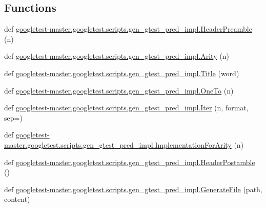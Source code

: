 \subsection*{Functions}
\begin{DoxyCompactItemize}
\item 
def \mbox{\hyperlink{namespacegoogletest-master_1_1googletest_1_1scripts_1_1gen__gtest__pred__impl_a3fc75fccee1b1e6492521b98b6d8ec86}{googletest-\/master.\+googletest.\+scripts.\+gen\+\_\+gtest\+\_\+pred\+\_\+impl.\+Header\+Preamble}} (n)
\item 
def \mbox{\hyperlink{namespacegoogletest-master_1_1googletest_1_1scripts_1_1gen__gtest__pred__impl_a2f93487ca4d27fe4f50d4d2819a1e4d2}{googletest-\/master.\+googletest.\+scripts.\+gen\+\_\+gtest\+\_\+pred\+\_\+impl.\+Arity}} (n)
\item 
def \mbox{\hyperlink{namespacegoogletest-master_1_1googletest_1_1scripts_1_1gen__gtest__pred__impl_ab0c6365ae868b3a83c97decf01e11657}{googletest-\/master.\+googletest.\+scripts.\+gen\+\_\+gtest\+\_\+pred\+\_\+impl.\+Title}} (word)
\item 
def \mbox{\hyperlink{namespacegoogletest-master_1_1googletest_1_1scripts_1_1gen__gtest__pred__impl_a840f7cde355a64a957439f38793fbdff}{googletest-\/master.\+googletest.\+scripts.\+gen\+\_\+gtest\+\_\+pred\+\_\+impl.\+One\+To}} (n)
\item 
def \mbox{\hyperlink{namespacegoogletest-master_1_1googletest_1_1scripts_1_1gen__gtest__pred__impl_a62e453d3ebe1044e73975720b0cebea3}{googletest-\/master.\+googletest.\+scripts.\+gen\+\_\+gtest\+\_\+pred\+\_\+impl.\+Iter}} (n, format, sep=\textquotesingle{}\textquotesingle{})
\item 
def \mbox{\hyperlink{namespacegoogletest-master_1_1googletest_1_1scripts_1_1gen__gtest__pred__impl_ad838f5c4c75d2b464fb7323caab20883}{googletest-\/master.\+googletest.\+scripts.\+gen\+\_\+gtest\+\_\+pred\+\_\+impl.\+Implementation\+For\+Arity}} (n)
\item 
def \mbox{\hyperlink{namespacegoogletest-master_1_1googletest_1_1scripts_1_1gen__gtest__pred__impl_a9a200952da021e4ddf195d1a3589c6a8}{googletest-\/master.\+googletest.\+scripts.\+gen\+\_\+gtest\+\_\+pred\+\_\+impl.\+Header\+Postamble}} ()
\item 
def \mbox{\hyperlink{namespacegoogletest-master_1_1googletest_1_1scripts_1_1gen__gtest__pred__impl_af8d9b8820500d6fcf791895a34892931}{googletest-\/master.\+googletest.\+scripts.\+gen\+\_\+gtest\+\_\+pred\+\_\+impl.\+Generate\+File}} (path, content)
\item 

\end{DoxyCompactItemize}
